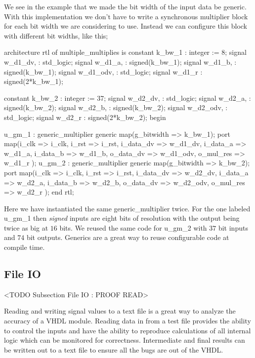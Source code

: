 We see in the example that we made the bit width of the input data be generic. With this implementation we don't have to write a synchronous multiplier block for each bit width we are considering to use. Instead we can configure this block with different bit widths, like this;

\begin{VHDLlisting}[tabsize=4]
architecture rtl of multiple_multiplies is
	constant k_bw_1    : integer := 8;
	signal w_d1_dv,    : std_logic;
	signal w_d1_a,     : signed(k_bw_1);
	signal w_d1_b,     : signed(k_bw_1);
	signal w_d1_odv,   : std_logic;
	signal w_d1_r      : signed(2*k_bw_1);

	constant k_bw_2    : integer := 37;
	signal w_d2_dv,    : std_logic;
	signal w_d2_a,     : signed(k_bw_2);
	signal w_d2_b,     : signed(k_bw_2);
	signal w_d2_odv,   : std_logic;
	signal w_d2_r      : signed(2*k_bw_2);
begin

u_gm_1 : generic_multiplier
generic map(g_bitwidth => k_bw_1);
port map(i_clk      => i_clk,
		 i_rst      => i_rst,
		 i_data_dv  => w_d1_dv,
		 i_data_a   => w_d1_a,
		 i_data_b   => w_d1_b,
		 o_data_dv  => w_d1_odv,
		 o_mul_res  => w_d1_r
);
u_gm_2 : generic_multiplier
generic map(g_bitwidth => k_bw_2);
port map(i_clk      => i_clk,
		 i_rst      => i_rst,
		 i_data_dv  => w_d2_dv,
		 i_data_a   => w_d2_a,
		 i_data_b   => w_d2_b,
		 o_data_dv  => w_d2_odv,
		 o_mul_res  => w_d2_r
);
end rtl;
\end{VHDLlisting}

Here we have instantiated the same generic\_multiplier twice. For the one labeled u\_gm\_1 then \emph{signed} inputs are eight bits of resolution with the output being twice as big at $16$ bits. We reused the same code for u\_gm\_2 with $37$ bit inputs and $74$ bit outputs. Generics are a great way to reuse configurable code at compile time.
	
\subsection{File IO}
	<TODO Subsection File IO : PROOF READ>

Reading and writing signal values to a text file is a great way to analyze the accuracy of a \ac{VHDL} module. Reading data in from a test file provides the ability to control the inputs and have the ability to reproduce calculations of all internal logic which can be monitored for correctness. Intermediate and final results can be written out to a text file to ensure all the bugs are out of the \ac{VHDL}. 

